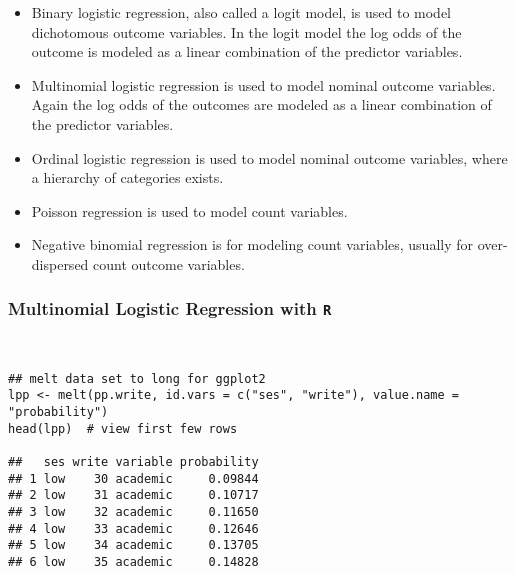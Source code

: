 \documentclass[00-GLMregslides.tex]{subfiles}
\begin{document}
\begin{frame}
\Large
\begin{itemize}
\item Binary logistic regression, also called a logit model, is used to model dichotomous outcome variables. In the logit model the log odds of the outcome is modeled as a linear combination of the predictor variables.
\item Multinomial logistic regression is used to model nominal outcome variables. Again the log odds of the outcomes are modeled as a linear combination of the predictor variables.
\item Ordinal logistic regression is used to model nominal outcome variables, where a hierarchy of categories exists.
\end{itemize}
\end{frame}
\begin{frame}
\Large
\begin{itemize}
\item  Poisson regression is used to model count variables.
\item  Negative binomial regression is for modeling count variables, usually for over-dispersed count outcome variables.
\end{itemize}
\end{frame}
\begin{frame}[fragile]
\frametitle{Multinomial Logistic Regression with \texttt{R} }
\begin{framed}
\begin{verbatim}


## melt data set to long for ggplot2
lpp <- melt(pp.write, id.vars = c("ses", "write"), value.name = "probability")
head(lpp)  # view first few rows
 
##   ses write variable probability
## 1 low    30 academic     0.09844
## 2 low    31 academic     0.10717
## 3 low    32 academic     0.11650
## 4 low    33 academic     0.12646
## 5 low    34 academic     0.13705
## 6 low    35 academic     0.14828
 



\end{verbatim}
\end{framed}
\end{frame}
\end{document}
